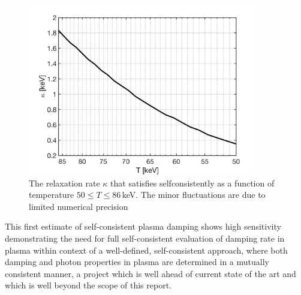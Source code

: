 \begin{figure} 
\centerline{
\includegraphics[width=0.9\textwidth]{./plots/OverdampingKappa.jpg}}
\caption{The relaxation rate $\kappa$ that satisfies  selfconsistently as a function of temperature $50\leqslant T\leqslant 86$\,keV. The minor fluctuations are due to limited numerical precision}
\label{KappaSol:fig} 
\end{figure}

This first estimate of self-consistent plasma damping shows high sensitivity demonstrating the need for full self-consistent evaluation of damping  rate in plasma within context  of a well-defined, self-consistent approach, where both damping and photon properties in plasma are determined in a mutually consistent manner, a project which is well ahead of current state of the art and which is well beyond the scope of this report.  




\label{sec:Discussion}

